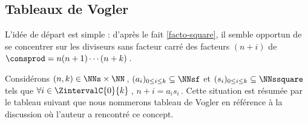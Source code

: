 \subsection{Tableaux de Vogler}

\leavevmode
\smallskip

L'idée de départ est simple : d'après le fait \ref{facto-square}, il semble opportun de se concentrer sur les diviseurs sans facteur carré des facteurs $(n + i)$ de $\consprod = n (n + 1) \cdots (n + k)$\,. 




\begin{defi}
	Considérons $(n, k) \in \NNs \times \NN$\,,
	$( a_i )_{0 \leq i \leq k} \subseteq \NNsf$
	et
	$( s_i )_{0 \leq i \leq k} \subseteq \NNssquare$
	tels que 
	$\forall i \in \ZintervalC{0}{k}$\,, $n + i = a_i s_i$\,.
	Cette situation est résumée par le tableau suivant que nous nommerons tableau de Vogler en référence à la discussion où l'auteur a rencontré ce concept.

	\begin{center}
	\end{center}
\end{defi}




